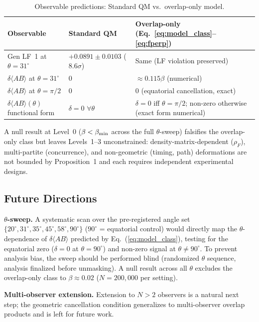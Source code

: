 \documentclass[twocolumn,aps,pra,superscriptaddress,floatfix,10pt]{revtex4-2}
\begin{document}
\begin{table}[H]
\centering
\caption{Observable predictions: Standard QM vs.\ overlap-only model.}
\label{tab:observables}
\small
\begin{tabular}{p{}p{}p{}}
\toprule
Observable & Standard QM & Overlap-only (Eq.~\ref{eq:model_class}--\ref{eq:fperp}) \\
\midrule
Gen LF~1 at $\theta = 31^\circ$ & $+0.0891 \pm 0.0103$ ($8.6\sigma$) & Same (LF violation preserved) \\
$\delta\langle AB\rangle$ at $\theta = 31^\circ$ & $0$ & $\approx 0.115\beta$ (numerical) \\
$\delta\langle AB\rangle$ at $\theta = \pi/2$ & $0$ & $0$ (equatorial cancellation, exact) \\
$\delta\langle AB\rangle(\theta)$ functional form & $\delta = 0$ $\forall\theta$ & $\delta = 0$ iff $\theta = \pi/2$; non-zero otherwise (exact form numerical) \\
\bottomrule
\end{tabular}
\end{table}

A null result at Level~0 ($\beta < \beta_{\rm min}$ across the full $\theta$-sweep) falsifies the overlap-only class but leaves Levels~1--3 unconstrained: density-matrix-dependent ($\rho_F$), multi-partite (concurrence), and non-geometric (timing, path) deformations are not bounded by Proposition~1 and each requires independent experimental designs.

\subsection{Future Directions}
\label{sec:future}

\textbf{$\theta$-sweep.} A systematic scan over the pre-registered angle set
$\{20^\circ, 31^\circ, 35^\circ, 45^\circ, 58^\circ, 90^\circ\}$ ($90^\circ$ = equatorial control) would
directly map the $\theta$-dependence of $\delta\langle AB\rangle$ predicted by Eq.~(\ref{eq:model_class}), testing
for the equatorial zero ($\delta = 0$ at $\theta = 90^\circ$) and non-zero signal at
$\theta \neq 90^\circ$. To prevent
analysis bias, the sweep should be performed blind (randomized $\theta$ sequence,
analysis finalized before unmasking). A null result across all $\theta$
excludes the overlap-only class to $\beta \approx 0.02$ ($N = 200{,}000$ per setting).

\textbf{Multi-observer extension.} Extension to $N > 2$ observers is a natural
next step; the geometric cancellation condition generalizes to multi-observer
overlap products and is left for future work.
\end{document}
